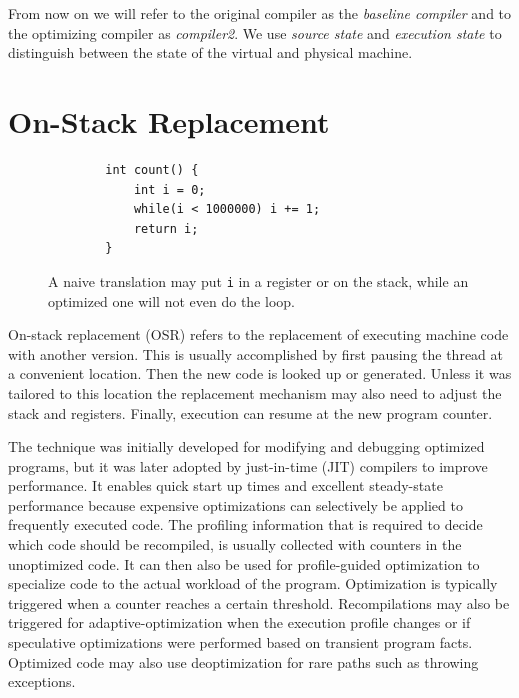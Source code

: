 \documentclass[draft,final]{vutinfth} %
\begin{document}
    From now on we will refer to the original compiler as the \emph{baseline compiler} and
    to the optimizing compiler as \emph{compiler2}.
    We use \emph{source state} and \emph{execution state} to distinguish between
    the state of the virtual and physical machine.


    \section{On-Stack Replacement}

    \begin{figure}[h]
        \begin{lstlisting}
        int count() {
            int i = 0;
            while(i < 1000000) i += 1;
            return i;
        }
        \end{lstlisting}
        \caption{A naive translation may put \lstinline{i} in a register or on the stack, while an optimized one will not even do the loop.}
    \end{figure}

    On-stack replacement (OSR) refers to the replacement of executing machine code with another version.
    This is usually accomplished by first pausing the thread at a convenient location.
    Then the new code is looked up or generated.
    Unless it was tailored to this location the replacement mechanism may also need to adjust the stack and registers.
    Finally, execution can resume at the new program counter.

    The technique was initially developed for modifying and debugging optimized programs\cite{10.1145/191081.191116},
    but it was later adopted by just-in-time (JIT) compilers to improve performance.
    It enables quick start up times and excellent steady-state performance
    because expensive optimizations can selectively be applied to frequently executed code.
    The profiling information that is required to decide which code should be recompiled,
    is usually collected with counters in the unoptimized code.
    It can then also be used for profile-guided optimization to specialize code to the actual workload of the program.
    Optimization is typically triggered when a counter reaches a certain threshold.
    Recompilations may also be triggered for adaptive-optimization
    when the execution profile changes
    or if speculative optimizations were performed based on transient program facts.
    Optimized code may also use deoptimization for rare paths such as throwing exceptions.
\end{document}
